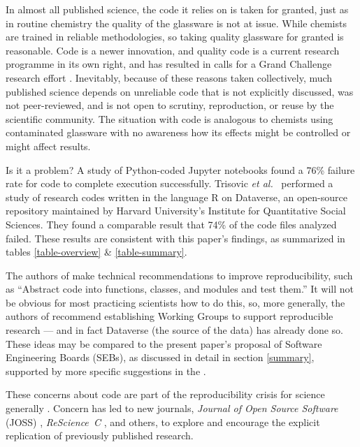 \documentclass{comjnl}
\begin{document}
In almost all published science, the code it relies on is taken for granted, just as in routine chemistry the quality of the glassware is not at issue. While chemists are trained in reliable methodologies, so taking quality glassware for granted is reasonable. Code is a newer innovation, and quality code is a current research programme in its own right, and has resulted in calls for a Grand Challenge research effort \cite{hoare-correctness}. Inevitably, because of these reasons taken collectively, much published science depends on unreliable code that is not explicitly discussed, was not peer-reviewed, and is not open to scrutiny, reproduction, or reuse by the scientific community. The situation with code is analogous to chemists using contaminated glassware with no awareness how its effects might be controlled or might affect results.

Is it a problem? A study of  Python-coded Jupyter notebooks \cite{jupyter-study} found a 76\% failure rate for code to complete execution successfully. Trisovic \emph{et al.}\ \cite{trisovic} performed a  study of  research codes written in the language R on Dataverse, an open-source repository maintained by Harvard University's Institute for Quantitative Social Sciences. They found a comparable result that 74\% of the code files analyzed failed. These results are consistent with this paper's findings, as summarized in tables \ref{table-overview} \& \ref{table-summary}. 

The authors of \cite{jupyter-study} make technical recommendations to improve reproducibility, such as ``Abstract code into functions, classes, and modules and test them.'' It will not be obvious for most practicing scientists how to do this, so, more generally, the authors of \cite{trisovic} recommend establishing Working Groups to support reproducible research --- and in fact Dataverse (the source of the \cite{trisovic} data) has already done so. These ideas may be compared to the present paper's proposal of Software Engineering Boards (SEBs), as discussed in detail in section \ref{summary}, supported by more specific suggestions in the \supplement.

These concerns about code are part of the reproducibility crisis for science generally \cite{machine-learning-reproducibility,no-raw-data,data-access,reproducible-manifesto,reproducibility-crisis}. Concern has led to new journals, \emph{Journal of Open Source Software\/} (JOSS) \cite{joss}, \emph{ReScience~C\/} \cite{rescience}, and  others, to explore and encourage the explicit replication of previously published research. 
\end{document}
